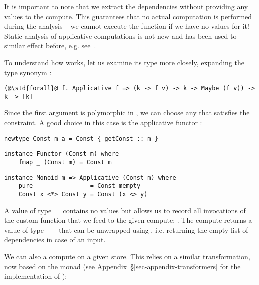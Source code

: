 \noindent
It is important to note that we extract the dependencies without providing any
values to the compute. This guarantees that no actual computation is performed
during the analysis -- we cannot execute the function \hs{(+)} if we have no
values for it! Static analysis of applicative computations is not new and has
been used to similar effect before, e.g. see~\cite{free-applicatives}.

To understand how  works, let us examine its type more closely,
expanding the type synonym :

\vspace{1mm}
\begin{verbatim}
(@\std{forall}@ f. Applicative f => (k -> f v) -> k -> Maybe (f v)) -> k -> [k]
\end{verbatim}
\vspace{1mm}

\noindent
Since the first argument is polymorphic in , we can choose any  that
satisfies the  constraint. A good choice in this case is the
applicative functor :

\vspace{1mm}
\begin{verbatim}
newtype Const m a = Const { getConst :: m }
\end{verbatim}
\vspace{0.5mm}
\begin{verbatim}
instance Functor (Const m) where
    fmap _ (Const m) = Const m
\end{verbatim}
\vspace{0.5mm}
\begin{verbatim}
instance Monoid m => Applicative (Const m) where
    pure _              = Const mempty
    Const x <*> Const y = Const (x <> y)
\end{verbatim}
\vspace{1mm}

\noindent
A value of type ~\hs{[}\hs{k]}~ contains no values  but
allows us to record all invocations of the custom  function that we
feed to the given compute: . The compute returns a
value of type ~~\hs{[}\hs{k]}~ that can be
unwrapped using , i.e. returning the empty list of
dependencies in case of an input.

We can also  a compute on a given store. This relies on a similar
transformation, now based on the  monad (see
Appendix~\S\ref{sec-appendix-transformers} for the implementation of
):

